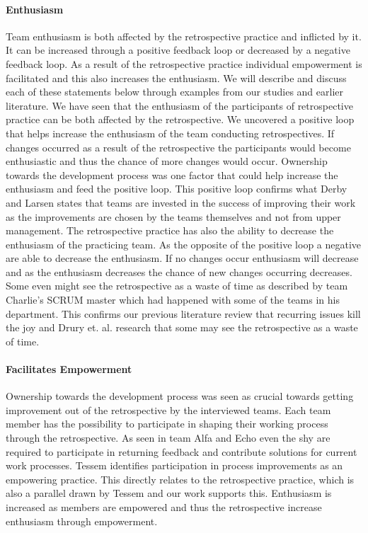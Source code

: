 \paragraph{Enthusiasm}
\label{section:positive-loop-enthusiasm}
Team enthusiasm is both affected by the retrospective practice and inflicted by it. It can be increased through a positive feedback loop or decreased by a negative feedback loop. As a result of the retrospective practice individual empowerment is facilitated and this also increases the enthusiasm. We will describe and discuss each of these statements below through examples from our studies and earlier literature. 
\label{posi-loop}
We have seen that the enthusiasm of the participants of retrospective practice can be both affected by the retrospective. We uncovered a positive loop that helps increase the enthusiasm of the team conducting retrospectives. If changes occurred as a result of the retrospective the participants would become enthusiastic and thus the chance of more changes would occur. Ownership towards the development process was one factor that could help increase the enthusiasm and feed the positive loop. This positive loop confirms what Derby and Larsen \cite{Larsen2006} states that teams are invested in the success of improving their work as the improvements are chosen by the teams themselves and not from upper management. 
\label{negi-loop}
The retrospective practice has also the ability to decrease the enthusiasm of the practicing team. As the opposite of the positive loop a negative are able to decrease the enthusiasm. If no changes occur enthusiasm will decrease and as the enthusiasm decreases the chance of new changes occurring decreases. Some even might see the retrospective as a waste of time as described by team Charlie's SCRUM master which had happened with some of the teams in his department. This confirms our previous literature review \cite{Dolvik2014} that recurring issues kill the joy and Drury et. al. \cite{Drury2012} research that some may see the retrospective as a waste of time. 

\paragraph{Facilitates Empowerment}
Ownership towards the development process was seen as crucial towards getting improvement out of the retrospective by the interviewed teams. Each team member has the possibility to participate in shaping their working process through the retrospective. As seen in team Alfa and Echo even the shy are required to participate in returning feedback and contribute solutions for current work processes. Tessem \cite{Tessem2014} identifies participation in process improvements as an empowering practice. This directly relates to the retrospective practice, which is also a parallel drawn by Tessem and our work supports this. Enthusiasm is increased as members are empowered\cite{Tessem2014} and thus the retrospective increase enthusiasm through empowerment. 


